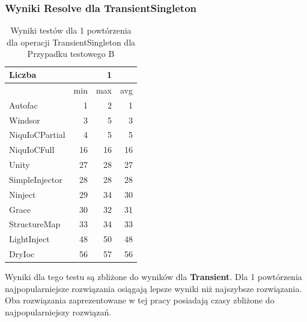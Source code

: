 \documentclass[12pt]{article}
\begin{document}
\subsubsection{Wyniki Resolve dla TransientSingleton}
\begin{table}[H]
\captionsetup{belowskip=0pt,aboveskip=0pt}
\begin{center}
\begin{small}
	\begin{tabular}{ | l | r r r | }
    		\hline
Liczba & & 1 & \\ \hline
 & min & max & avg \\ \hline
Autofac & 1 & 2 & 1 \\ \hline
Windsor & 3 & 5 & 3 \\ \hline
NiquIoCPartial & 4 & 5 & 5 \\ \hline
NiquIoCFull & 16 & 16 & 16 \\ \hline
Unity & 27 & 28 & 27 \\ \hline
SimpleInjector & 28 & 28 & 28 \\ \hline
Ninject & 29 & 34 & 30 \\ \hline
Grace & 30 & 32 & 31 \\ \hline
StructureMap & 33 & 34 & 33 \\ \hline
LightInject & 48 & 50 & 48 \\ \hline
DryIoc & 56 & 57 & 56 \\ \hline
  	\end{tabular}
\end{small}
\end{center}
\caption{Wyniki testów dla 1 powtórzenia dla operacji TransientSingleton dla Przypadku testowego B}
\label{TestCaseB_TransientSingleton1}
\end{table}
Wyniki dla tego testu są zbliżone do wyników dla \textbf{Transient}. Dla 1 powtórzenia najpopularniejsze rozwiązania osiągają lepsze wyniki niż najszybsze rozwiązania. Oba rozwiązania zaprezentowane w tej pracy posiadają czasy zbliżone do najpopularniejszy rozwiązań.
\\ \\
\end{document}
